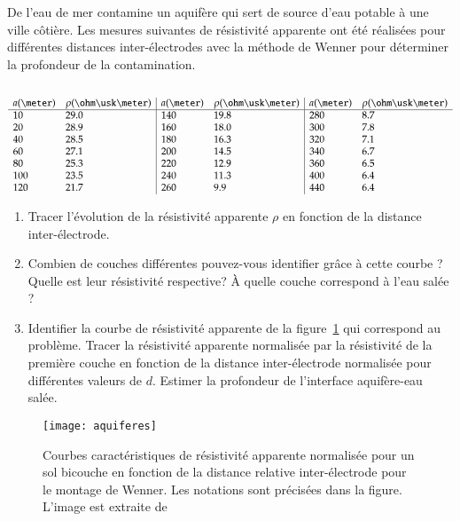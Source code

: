 \begin{exocor}
	De l'eau de mer contamine un aquifère qui sert de source d'eau potable à 
	une ville côtière. Les mesures suivantes de résistivité apparente ont été
	réalisées pour différentes distances inter-électrodes avec la méthode de 
	Wenner pour déterminer la profondeur de la contamination.
	
	\begin{equation*}
	\begin{array}{l l| l l| l l} \\
		a (\meter) & \rho (\ohm \usk \meter) & a (\meter) & 
		\rho (\ohm \usk \meter) &a(\meter) & \rho (\ohm \usk \meter) \\ \hline
		10	& 29.0	& 140	& 19.8	& 280	& 8.7 \\
		20	& 28.9	& 160	& 18.0	& 300	& 7.8 \\
		40 	& 28.5	& 180	& 16.3	& 320	& 7.1 \\
		60	& 27.1  & 200	& 14.5	& 340	& 6.7 \\
		80	& 25.3	& 220	& 12.9	& 360	& 6.5 \\
		100	& 23.5	& 240	& 11.3	& 400	& 6.4 \\
		120	& 21.7	& 260	& 9.9	& 440	& 6.4 \\
	\end{array}
	\end{equation*}
	
	\begin{enumerate}
		\item Tracer l'évolution de la résistivité apparente $\rho$ 
		  en fonction de la distance inter-électrode.
		\item Combien de couches différentes pouvez-vous identifier 
		  grâce à cette courbe ? Quelle est leur résistivité respective? 
		  À quelle couche correspond à l'eau salée ?
	  \item Identifier la courbe de résistivité apparente de la figure~\ref{fig:aquiferes}
	    qui correspond au problème. Tracer la résistivité apparente 
	    normalisée par la résistivité de la première 
	    couche en fonction de la distance inter-électrode normalisée pour 
	    différentes valeurs de $d$.
	    Estimer la profondeur de l'interface 
	    aquifère-eau salée. 	
	    \end{enumerate}

\end{exocor}

\begin{figure}[h!]
	\centering
	\texttt{[image: aquiferes]}
	\caption{Courbes caractéristiques de résistivité apparente normalisée pour un sol
		 bicouche en fonction de la distance relative inter-électrode 
		 pour le montage de Wenner. Les
	 	notations sont précisées dans la figure. L'image est extraite de 
		\cite{Lowrie2007}}%
	\label{fig:aquiferes}
\end{figure}

